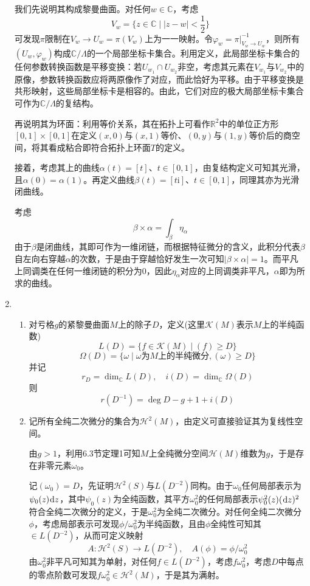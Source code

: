 \documentclass[a4paper,UTF8,fontset=windows,10pt]{ctexart}
\newcommand*{\ir}{\mathrm{i}}
\newcommand*{\dr}{\hspace{0.07em}\mathrm{d}}
\begin{document}
\begin{enumerate}
    我们先说明其构成黎曼曲面。对任何$w\in\mathbb{C}$，考虑
    $$V_w=\bigg\{z\in\mathbb{C}\mid|z-w|<\frac{1}{2}\bigg\}$$
    可发现$\pi$限制在$V_w\to U_w=\pi(V_w)$上为一一映射。令$\varphi_w=\pi|_{V_w\to U_w}^{-1}$，则所有$(U_w,\varphi_w)$构成$\mathbb{C}/\Lambda$的一个局部坐标卡集合。利用定义，此局部坐标卡集合的任何参数转换函数是平移变换：若$U_{w_1}\cap U_{w_2}$非空，考虑其元素在$V_{w_1}$与$V_{w_2}$中的原像，参数转换函数应将两原像作了对应，而此恰好为平移。由于平移变换是共形映射，这些局部坐标卡是相容的。由此，它们对应的极大局部坐标卡集合可作为$\mathbb{C}/\Lambda$的复结构。

    再说明其为环面：利用等价关系，其在拓扑上可看作$\mathbb{R}^2$中的单位正方形$[0,1]\times[0,1]$在定义$(x,0)$与$(x,1)$等价、$(0,y)$与$(1,y)$等价后的商空间，将其看成粘合即符合拓扑上环面$T$的定义。

    接着，考虑其上的曲线$\alpha(t)=[t]$、$t\in[0,1]$，由复结构定义可知其光滑，且$\alpha(0)=\alpha(1)$。再定义曲线$\beta(t)=[t\ir]$、$t\in[0,1]$，同理其亦为光滑闭曲线。

    考虑
    $$\beta\times\alpha=\int_\beta\eta_\alpha$$
    由于$\beta$是闭曲线，其即可作为一维闭链，而根据特征微分的含义，此积分代表$\beta$自左向右穿越$\alpha$的次数，于是由于穿越恰好发生一次可知$|\beta\times\alpha|=1$。而平凡上同调类在任何一维闭链的积分为0，因此$\eta_\alpha$对应的上同调类非平凡，$\alpha$即为所求的曲线。

    \item
    \begin{enumerate}
        \item 对亏格$g$的紧黎曼曲面$M$上的除子$D$，定义(这里$\mathscr{K}(M)$表示$M$上的半纯函数)
        $$L(D)=\{f\in\mathscr{K}(M)\mid(f)\ge D\}$$
        $$\Omega(D)=\{\omega\mid\omega\text{为}M\text{上的半纯微分},(\omega)\ge D\}$$
        并记
        $$r_D=\dim_{\mathbb{C}}L(D),\quad i(D)=\dim_{\mathbb{C}}\Omega(D)$$
        则
        $$r(D^{-1})=\deg D-g+1+i(D)$$

        \item 记所有全纯二次微分的集合为$\mathscr{H}^2(M)$，由定义可直接验证其为复线性空间。
        
        由$g>1$，利用6.3节定理1可知$M$上全纯微分空间$\mathscr{H}(M)$维数为$g$，于是存在非零元素$\omega_0$。
        
        记$(\omega_0)=D$，先证明$\mathscr{H}^2(S)$与$L(D^{-2})$同构。由于$\omega_0$任何局部表示为$\psi_0(z)\dr z$，其中$\psi_0(z)$为全纯函数，其平方$\omega_0^2$的任何局部表示$\psi_0^2(z)(\dr z)^2$符合全纯二次微分的定义，于是$\omega_0^2$为全纯二次微分。对任何全纯二次微分$\phi$，考虑局部表示可发现$\phi/\omega_0^2$为半纯函数，且由$\phi$全纯性可知其$\in L(D^{-2})$，从而可定义映射
        $$A:\mathscr{H}^2(S)\to L(D^{-2}),\quad A(\phi)=\phi/\omega_0^2$$
        由$\omega_0^2$非平凡可知其为单射，对任何$f\in L(D^{-2})$，考虑$f\omega_0^2$，考虑$D$中每点的零点阶数可发现$f\omega_0^2\in\mathscr{H}^2(M)$，于是其为满射。


\end{enumerate}
\end{enumerate}
\end{document}
